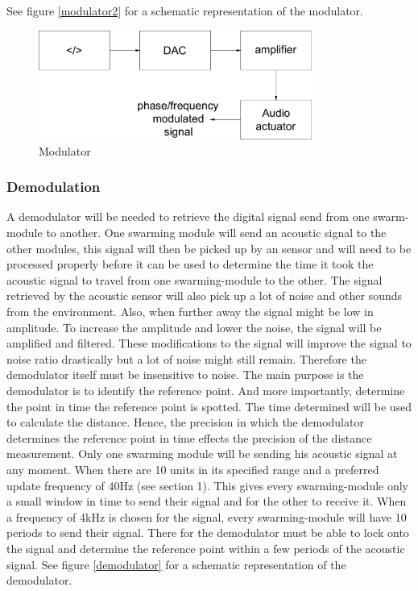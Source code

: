 \documentclass[10pt,a4paper]{article}
\begin{document}
See figure \ref{modulator2} for a schematic representation of the modulator.

\begin{figure}[H]
  \centering
      \includegraphics[width=0.8\textwidth]{modulator2.pdf}
  \caption{Modulator}
  \label{modulator}
\end{figure}

\subsubsection{Demodulation}

A demodulator will be needed to retrieve the digital signal send from one swarm-module to another.  One swarming module will send an acoustic signal to the other modules, this signal will then be picked up by an sensor and will need to be processed properly before it can be used to determine the time it took the acoustic signal to travel from one swarming-module to the other. The signal retrieved by the acoustic sensor will also pick up a lot of noise and other sounds from the environment. Also, when further away the signal might be low in amplitude. To increase the amplitude and lower the noise, the signal will be amplified and filtered. These modifications to the signal will improve the signal to noise ratio drastically but a lot of noise might still remain. Therefore the demodulator itself must be insensitive to noise.  
The main purpose is the demodulator is to identify the reference point. And more importantly, determine the point in time the reference point is spotted. The time determined will be used to calculate the distance. Hence, the precision in which the demodulator determines the reference point in time effects the precision of the distance measurement. Only one swarming module will be sending his acoustic signal at any moment. When there are 10 units in its specified range and a preferred update frequency of 40Hz (see section 1). This gives every swarming-module only a small window in time to send their signal and for the other to receive it. When a frequency of 4kHz is chosen for the signal, every swarming-module will have 10 periods to send their signal. There for the demodulator must be able to lock onto the signal and determine the reference point within a few periods of the acoustic signal. See figure \ref{demodulator} for a schematic representation of the demodulator.
\end{document}

